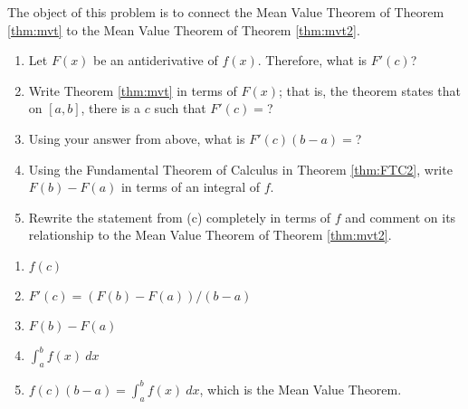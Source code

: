 {The object of this problem is to connect the Mean Value Theorem of Theorem \ref{thm:mvt} to the Mean Value Theorem of Theorem \ref{thm:mvt2}.
\begin{enumerate}
\item		Let $F(x)$ be an antiderivative of $f(x)$. Therefore, what is $F'(c)$?
\item		Write Theorem \ref{thm:mvt} in terms of $F(x)$; that is, the theorem states that on $[a,b]$, there is a $c$ such that $F'(c) = $?
\item		Using your answer from above, what is $F'(c)(b-a)=$?
\item		Using the Fundamental Theorem of Calculus in Theorem \ref{thm:FTC2}, write $F(b) -F(a)$ in terms of an integral of $f$.
\item		Rewrite the statement from (c) completely in terms of $f$ and comment on its relationship to the Mean Value Theorem of Theorem \ref{thm:mvt2}.
\end{enumerate}
}
{\begin{enumerate}
\item		$f(c)$
\item		$F'(c) = (F(b)-F(a))/(b-a)$
\item		$F(b) - F(a)$
\item		$\int_a^b f(x) \ dx$
\item		$f(c)(b-a) = \int_a^b f(x)\ dx$, which is the Mean Value Theorem.
\end{enumerate}
}

